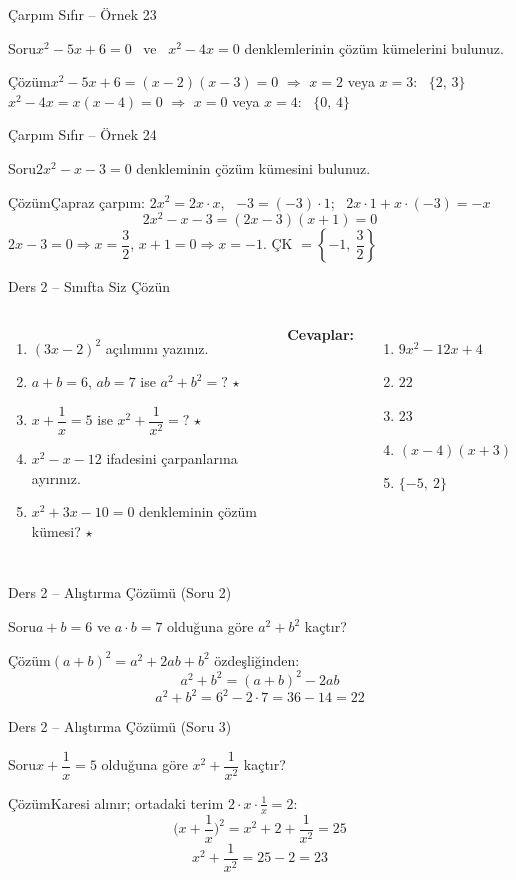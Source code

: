 \documentclass[aspectratio=169,11pt]{beamer}
\newcommand{\soru}[3]{%
\begin{frame}{#1}
  \begin{block}{Soru}\large #2\end{block}
  \pause
  \begin{exampleblock}{Çözüm}\large #3\end{exampleblock}
\end{frame}}
\begin{document}
\soru{Çarpım Sıfır -- Örnek 23}
{\(x^2-5x+6=0\) \ ve \ \(x^2-4x=0\) denklemlerinin çözüm kümelerini bulunuz.}
{\(x^2-5x+6=(x-2)(x-3)=0\) \(\Rightarrow\) \(x=2\) veya \(x=3\): \ \(\{2,\,3\}\)\\[4pt]
\(x^2-4x=x(x-4)=0\) \(\Rightarrow\) \(x=0\) veya \(x=4\): \ \(\{0,\,4\}\)}

\soru{Çarpım Sıfır -- Örnek 24}
{\(2x^2-x-3=0\) denkleminin çözüm kümesini bulunuz.}
{Çapraz çarpım: \(2x^2=2x\cdot x\), \ \(-3=(-3)\cdot 1\); \ \(2x\cdot 1+x\cdot(-3)=-x\) \checkmark
\[2x^2-x-3=(2x-3)(x+1)=0\]
\(2x-3=0\Rightarrow x=\dfrac{3}{2}\), \quad \(x+1=0\Rightarrow x=-1\). \quad ÇK \(=\left\{-1,\ \dfrac{3}{2}\right\}\)}

\begin{frame}{Ders 2 -- Sınıfta Siz Çözün}
\begin{columns}[t]
\begin{enumerate}
\item \((3x-2)^2\) açılımını yazınız.
\item \(a+b=6\), \(ab=7\) ise \(a^2+b^2=?\) \(\star\)
\item \(x+\dfrac{1}{x}=5\) ise \(x^2+\dfrac{1}{x^2}=?\) \(\star\)
\item \(x^2-x-12\) ifadesini çarpanlarına ayırınız.
\item \(x^2+3x-10=0\) denkleminin çözüm kümesi? \(\star\)
\end{enumerate}
\pause
\textbf{Cevaplar:}
\begin{enumerate}
\item \(9x^2-12x+4\)
\item \(22\)
\item \(23\)
\item \((x-4)(x+3)\)
\item \(\{-5,\ 2\}\)
\end{enumerate}
\end{columns}
\vspace{4pt}{\footnotesize \(\star\) işaretli soruların adım adım çözümü sonraki slaytlardadır.}
\end{frame}

\soru{Ders 2 -- Alıştırma Çözümü (Soru 2)}
{\(a+b=6\) ve \(a\cdot b=7\) olduğuna göre \(a^2+b^2\) kaçtır?}
{\((a+b)^2=a^2+2ab+b^2\) özdeşliğinden:
\[a^2+b^2=(a+b)^2-2ab\]
\[a^2+b^2=6^2-2\cdot 7=36-14=22\]}

\soru{Ders 2 -- Alıştırma Çözümü (Soru 3)}
{\(x+\dfrac{1}{x}=5\) olduğuna göre \(x^2+\dfrac{1}{x^2}\) kaçtır?}
{Karesi alınır; ortadaki terim \(2\cdot x\cdot\frac{1}{x}=2\):
\[\Big(x+\frac{1}{x}\Big)^2=x^2+2+\frac{1}{x^2}=25\]
\[x^2+\frac{1}{x^2}=25-2=23\]}
\end{document}
